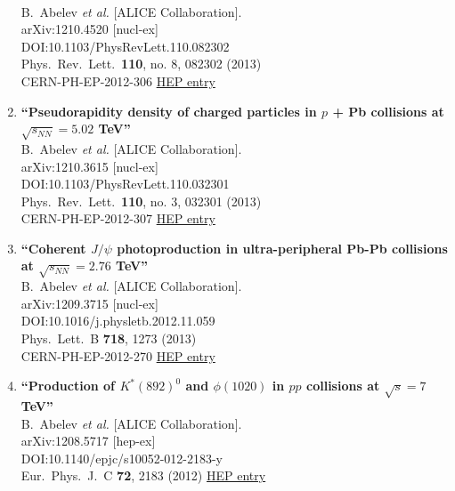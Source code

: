 \begin{enumerate}
  \\{}B.~Abelev {\it et al.} [ALICE Collaboration].
  \\{}arXiv:1210.4520 [nucl-ex]
  \\{}DOI:10.1103/PhysRevLett.110.082302
  \\{}Phys.\ Rev.\ Lett.\  {\bf 110}, no. 8, 082302 (2013)
  \\{}CERN-PH-EP-2012-306
\href{http://inspirehep.net/record/1190895}{HEP entry}
\item%
{\bf ``Pseudorapidity density of charged particles in $p$ + Pb collisions at $\sqrt{s_{NN}}=5.02$ TeV''}
  \\{}B.~Abelev {\it et al.} [ALICE Collaboration].
  \\{}arXiv:1210.3615 [nucl-ex]
  \\{}DOI:10.1103/PhysRevLett.110.032301
  \\{}Phys.\ Rev.\ Lett.\  {\bf 110}, no. 3, 032301 (2013)
  \\{}CERN-PH-EP-2012-307
\href{http://inspirehep.net/record/1190545}{HEP entry}
\item%
{\bf ``Coherent $J/\psi$ photoproduction in ultra-peripheral Pb-Pb collisions at $\sqrt{s_{NN}} = 2.76$ TeV''}
  \\{}B.~Abelev {\it et al.} [ALICE Collaboration].
  \\{}arXiv:1209.3715 [nucl-ex]
  \\{}DOI:10.1016/j.physletb.2012.11.059
  \\{}Phys.\ Lett.\ B {\bf 718}, 1273 (2013)
  \\{}CERN-PH-EP-2012-270
\href{http://inspirehep.net/record/1185785}{HEP entry}
\item%
{\bf ``Production of $K^*(892)^0$ and $\phi(1020)$ in $pp$ collisions at $\sqrt{s}=7$ TeV''}
  \\{}B.~Abelev {\it et al.} [ALICE Collaboration].
  \\{}arXiv:1208.5717 [hep-ex]
  \\{}DOI:10.1140/epjc/s10052-012-2183-y
  \\{}Eur.\ Phys.\ J.\ C {\bf 72}, 2183 (2012)
\href{http://inspirehep.net/record/1182213}{HEP entry}

\end{enumerate}
